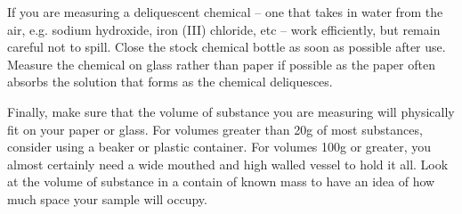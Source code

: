 If you are measuring a deliquescent chemical – one that takes in water from the air, e.g. sodium hydroxide, iron (III) chloride, etc – work efficiently, but remain careful not to spill. Close the stock chemical bottle as soon as possible after use. Measure the chemical on glass rather than paper if possible as the paper often absorbs the solution that forms as the chemical deliquesces.

Finally, make sure that the volume of substance you are measuring will physically fit on your paper or glass. For volumes greater than 20g of most substances, consider using a beaker or plastic container. For volumes 100g or greater, you almost certainly need a wide mouthed and high walled vessel to hold it all. Look at the volume of substance in a contain of known mass to have an idea of how much space your sample will occupy.
